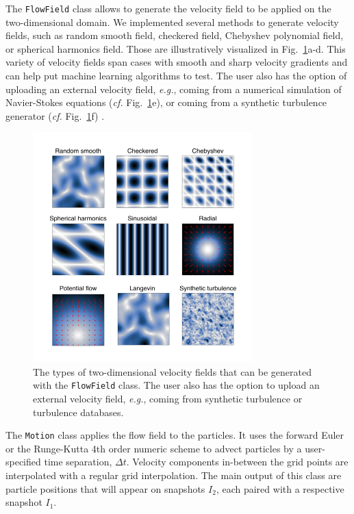 \documentclass[a4paper,fleqn]{cas-dc}
\begin{document}
The \texttt{FlowField} class allows to generate the velocity field to be applied on the two-dimensional domain. We implemented several methods to generate velocity fields, such as random smooth field, checkered field, Chebyshev polynomial field, or spherical harmonics field. Those are illustratively visualized in Fig.~\ref{fig:velocity-fields}a-d. This variety of velocity fields span cases with smooth and sharp velocity gradients and can help put machine learning algorithms to test. The user also has the option of uploading an external velocity field, \textit{e.g.}, coming from a numerical simulation of Navier-Stokes equations (\textit{cf.} Fig.~\ref{fig:velocity-fields}e), or coming from a synthetic turbulence generator (\textit{cf.} Fig.~\ref{fig:velocity-fields}f) \citep{saad2017scalable, richards2018fast}.

\begin{figure}[t]
\centering
\includegraphics[width=8.5cm]{velocity-fields.pdf}
\caption{The types of two-dimensional velocity fields that can be generated with the \texttt{FlowField} class. The user also has the option to upload an external velocity field, \textit{e.g.}, coming from synthetic turbulence or turbulence databases.}
\label{fig:velocity-fields}
\end{figure}

The \texttt{Motion} class applies the flow field to the particles. It uses the forward Euler or the Runge-Kutta 4th order numeric scheme to advect particles by a user-specified time separation, $\Delta t$. Velocity components in-between the grid points are interpolated with a regular grid interpolation. The main output of this class are particle positions that will appear on snapshots $I_2$, each paired with a respective snapshot $I_1$. 
\end{document}
